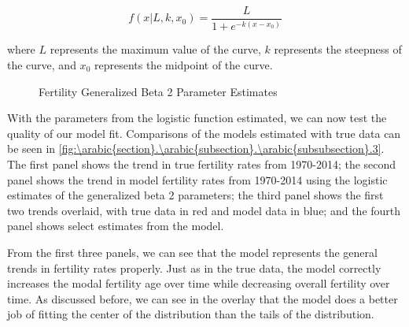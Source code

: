 \documentclass[10pt]{article}
\renewcommand{\thesection}{\arabic{section}}
\renewcommand{\thesubsection}{\thesection.\arabic{subsection}}
\renewcommand{\thesubsubsection}{\thesubsection.\arabic{subsubsection}}
\numberwithin{equation}{subsection}
\newcommand*{\FigureDir}{../../graphs}
\begin{document}
\begin{equation}\label{eq:logistic_fn}
   f(x|L, k, x_0) = \frac{L}{1 + e^{-k(x-x_0)}}
\end{equation}

\par where \(L\) represents the maximum value of the curve, \(k\) represents the steepness of the curve, and \(x_0\) represents the midpoint of the curve.

\begin{figure}[!ht]
   \centering
   \caption{\label{fig:\thesubsubsection.2}Fertility Generalized Beta 2 Parameter Estimates}
\end{figure}

\par With the parameters from the logistic function estimated, we can now test the quality of our model fit. Comparisons of the models estimated with true data can be seen in \autoref{fig:\thesubsubsection.3}. The first panel shows the trend in true fertility rates from 1970-2014; the second panel shows the trend in model fertility rates from 1970-2014 using the logistic estimates of the generalized beta 2 parameters; the third panel shows the first two trends overlaid, with true data in red and model data in blue; and the fourth panel shows select estimates from the model.

\par From the first three panels, we can see that the model represents the general trends in fertility rates properly. Just as in the true data, the model correctly increases the modal fertility age over time while decreasing overall fertility over time. As discussed before, we can see in the overlay that the model does a better job of fitting the center of the distribution than the tails of the distribution.
\end{document}
